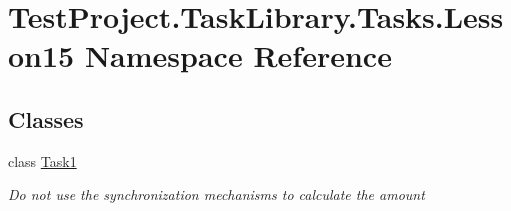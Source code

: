 \hypertarget{namespace_test_project_1_1_task_library_1_1_tasks_1_1_lesson15}{}\section{Test\+Project.\+Task\+Library.\+Tasks.\+Lesson15 Namespace Reference}
\label{namespace_test_project_1_1_task_library_1_1_tasks_1_1_lesson15}
\subsection*{Classes}
\begin{DoxyCompactItemize}
\item 
class \mbox{\hyperlink{class_test_project_1_1_task_library_1_1_tasks_1_1_lesson15_1_1_task1}{Task1}}
\begin{DoxyCompactList}\small\item\em Do not use the synchronization mechanisms to calculate the amount \end{DoxyCompactList}\end{DoxyCompactItemize}
